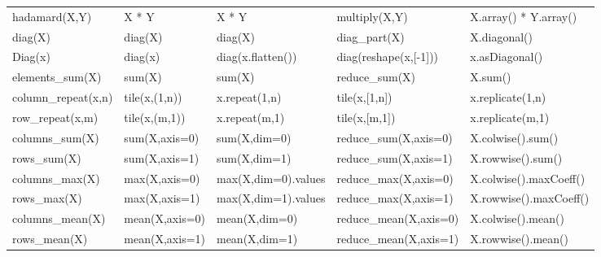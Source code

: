 \documentclass[twoside,11pt]{article}
\begin{document}
\begin{table}[h]
\begin{tabular}{ p{2.2cm}|p{2.6cm}p{2.6cm}p{2.6cm}p{3.6cm} }
\textsf{hadamard(X,Y)}         & \textsf{X * Y}                  & \textsf{X * Y}                   & \textsf{multiply(X,Y)}               & \textsf{X.array() * Y.array()}           \\
\textsf{diag(X)}               & \textsf{diag(X)}                & \textsf{diag(X)}                 & \textsf{diag\_part(X)}               & \textsf{X.diagonal()}                    \\
\textsf{Diag(x)}               & \textsf{diag(x)}                & \textsf{diag(x.flatten())}       & \textsf{diag(reshape(x,[-1]))}       & \textsf{x.asDiagonal()}                  \\
\textsf{elements\_sum(X)}      & \textsf{sum(X)}                 & \textsf{sum(X)}                  & \textsf{reduce\_sum(X)}              & \textsf{X.sum()}                         \\
\textsf{column\_repeat(x,n)}   & \textsf{tile(x,(1,n))}          & \textsf{x.repeat(1,n)}           & \textsf{tile(x,[1,n])}               & \textsf{x.replicate(1,n)}               \\
\textsf{row\_repeat(x,m)}      & \textsf{tile(x,(m,1))}          & \textsf{x.repeat(m,1)}           & \textsf{tile(x,[m,1])}               & \textsf{x.replicate(m,1)}               \\
\textsf{columns\_sum(X)}       & \textsf{sum(X,axis=0)}          & \textsf{sum(X,dim=0)}            & \textsf{reduce\_sum(X,axis=0)}       & \textsf{X.colwise().sum()}               \\
\textsf{rows\_sum(X)}          & \textsf{sum(X,axis=1)}          & \textsf{sum(X,dim=1)}            & \textsf{reduce\_sum(X,axis=1)}       & \textsf{X.rowwise().sum()}               \\
\textsf{columns\_max(X)}       & \textsf{max(X,axis=0)}          & \textsf{max(X,dim=0).values}     & \textsf{reduce\_max(X,axis=0)}       & \textsf{X.colwise().maxCoeff()}          \\
\textsf{rows\_max(X)}          & \textsf{max(X,axis=1)}          & \textsf{max(X,dim=1).values}     & \textsf{reduce\_max(X,axis=1)}       & \textsf{X.rowwise().maxCoeff()}          \\
\textsf{columns\_mean(X)}      & \textsf{mean(X,axis=0)}         & \textsf{mean(X,dim=0)}           & \textsf{reduce\_mean(X,axis=0)}      & \textsf{X.colwise().mean()}              \\
\textsf{rows\_mean(X)}         & \textsf{mean(X,axis=1)}         & \textsf{mean(X,dim=1)}           & \textsf{reduce\_mean(X,axis=1)}      & \textsf{X.rowwise().mean()}              \\

\end{tabular}
\end{table}
\end{document}
